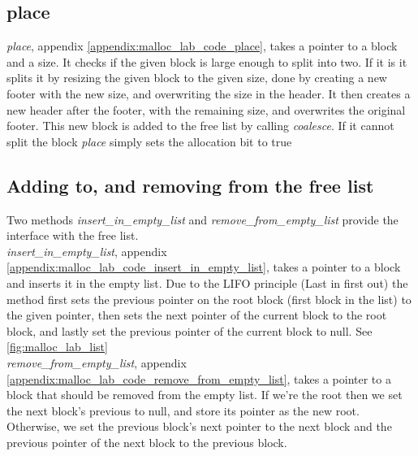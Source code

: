 \documentclass[11pt]{report}
\begin{document}
\newpage
\subsection{place}
\textit{place}, appendix \ref{appendix:malloc_lab_code_place}, takes a pointer to a block and a size. It checks if the given block is large enough to split into two. If it is it splits it by resizing the given block to the given size, done by creating a new footer with the new size, and overwriting the size in the header. It then creates a new header after the footer, with the remaining size, and overwrites the original footer. This new block is added to the free list by calling \textit{coalesce}. If it cannot split the block \textit{place} simply sets the allocation bit to true\\[1ex]

\subsection{Adding to, and removing from the free list}
Two methods \textit{insert\_in\_empty\_list} and \textit{remove\_from\_empty\_list} provide the interface with the free list.\\[1ex]

\textit{insert\_in\_empty\_list}, appendix \ref{appendix:malloc_lab_code_insert_in_empty_list}, takes a pointer to a block and inserts it in the empty list. Due to the LIFO principle (Last in first out) the method first sets the previous pointer on the root block (first block in the list) to the given pointer, then sets the next pointer of the current block to the root block, and lastly set the previous pointer of the current block to null. See \ref{fig:malloc_lab_list}\\[1ex]

\textit{remove\_from\_empty\_list}, appendix \ref{appendix:malloc_lab_code_remove_from_empty_list}, takes a pointer to a block that should be removed from the empty list. If we're the root then we set the next block's previous to null, and store its pointer as the new root. Otherwise, we set the previous block's next pointer to the next block and the previous pointer of the next block to the previous block.\\[1ex]
\end{document}
